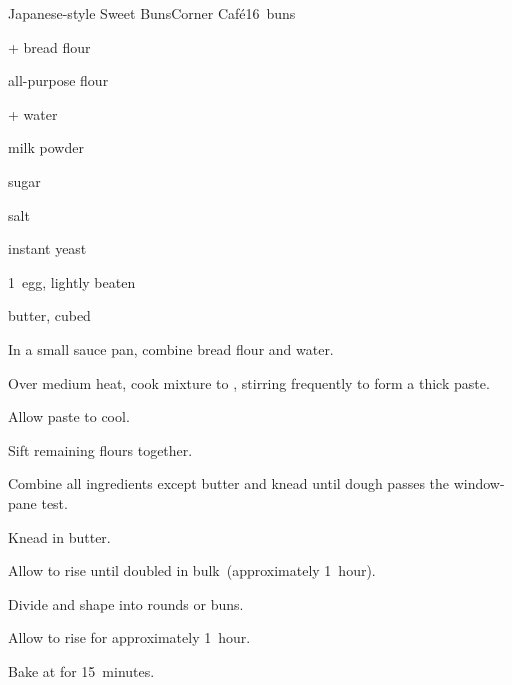 \begin{recipe}{Japanese-style Sweet Buns}{Corner Caf\'e}{16~buns}

\begin{ingredients}
\item {} +  bread flour
\item {} all-purpose flour
\item {} +  water
\item {} milk powder
\item {} sugar
\item \tp{\threequarters} salt
\item \tp{2\half} instant yeast
\item 1~egg, lightly beaten
\item {} butter, cubed
\end{ingredients}

\begin{directions}
\item In a small sauce pan, combine  bread flour and  water.
\item Over medium heat, cook mixture to , stirring frequently to form a thick paste.
\item Allow paste to cool.
\item Sift remaining flours together.
\item Combine all ingredients except butter and knead until dough passes the window-pane test.
\item Knead in butter.
\item Allow to rise until doubled in bulk~(approximately 1~hour).
\item Divide and shape into rounds or buns.
\item Allow to rise for approximately 1~hour.
\item Bake at  for 15~minutes.
\end{directions}

\end{recipe}
